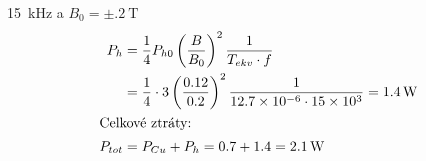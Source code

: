 \begin{example}
\begin{enumerate}
          \SI{15}{\kilo\Hz}\) a \(B_0 = \pm\SI{.2}{\tesla}\)
          \begin{align*}
            P_{h}   &= \frac{1}{4}P_{h0}\left(\frac{B}{B_0}\right)^2\frac{1}{T_{ekv}\cdot f} \\
                    &= \frac{1}{4}\cdot\num{3}\left(\frac{\num{.12}}{\num{.2}}\right)^2
                       \frac{1}{\num{12.7d-6}\cdot\num{15d3}} = \SI{1.4}{\watt}              \\
            \shortintertext{Celkové ztráty:}
            P_{tot} &= P_{Cu} + P_{h} = \num{.7} + \num{1.4} = \SI{2.1}{\watt}
          \end{align*}
  \end{enumerate}
\end{example}
